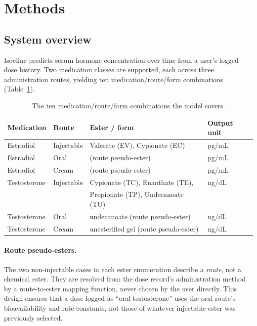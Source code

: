 \documentclass[11pt,a4paper]{article}
\begin{document}
\section{Methods}
\label{sec:methods}

\subsection{System overview}
\label{sec:overview}

Isocline predicts serum hormone concentration over time from a user's logged
dose history. Two medication classes are supported, each across three
administration routes, yielding ten medication/route/form combinations
(Table~\ref{tab:scope}).

\begin{table}[h]
\centering
\small
\begin{tabular}{@{}llll@{}}
\toprule
\textbf{Medication} & \textbf{Route} & \textbf{Ester / form} & \textbf{Output unit} \\
\midrule
Estradiol     & Injectable   & Valerate (EV), Cypionate (EC) & pg/mL \\
Estradiol     & Oral         & (route pseudo-ester)          & pg/mL \\
Estradiol     & Cream        & (route pseudo-ester)          & pg/mL \\
Testosterone  & Injectable   & Cypionate (TC), Enanthate (TE), & ng/dL \\
              &              & Propionate (TP), Undecanoate (TU) & \\
Testosterone  & Oral         & undecanoate (route pseudo-ester) & ng/dL \\
Testosterone  & Cream        & unesterified gel (route pseudo-ester) & ng/dL \\
\bottomrule
\end{tabular}
\caption{The ten medication/route/form combinations the model covers.}
\label{tab:scope}
\end{table}

\paragraph{Route pseudo-esters.} The two non-injectable cases in each
ester enumeration describe a \emph{route}, not a chemical ester. They
are resolved from the dose record's administration method by a
route-to-ester mapping function, never chosen by the user directly. This
design ensures that a dose logged as ``oral testosterone'' uses the
oral route's bioavailability and rate constants, not those of whatever
injectable ester was previously selected.
\end{document}
